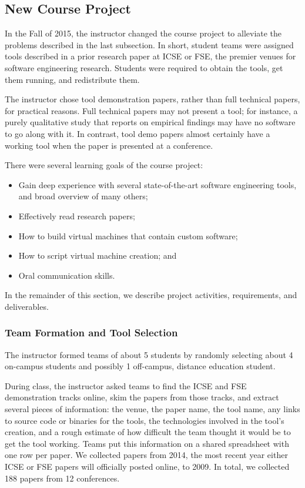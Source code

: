 \documentclass[10pt,conference]{IEEEtran}
\begin{document}
\subsection{New Course Project}\label{sec:thisProj}

In the Fall of 2015, the instructor changed the course project
to alleviate the problems described in the last subsection.
In short, student teams were assigned tools described in a 
prior research paper at ICSE or FSE, the premier 
venues for software engineering research.
Students were required to obtain the tools, get them running,
and redistribute them.

The instructor chose tool demonstration papers, rather than
full technical papers, for practical reasons.
Full technical papers may not present a tool; for 
instance, a purely qualitative study that reports on 
empirical findings may have no software to go along with it.
In contrast, tool demo papers almost certainly have a working
tool when the paper is presented at a conference. 

There were several learning goals of the course project:

\begin{itemize}
  \item Gain deep experience with several state-of-the-art
  		software engineering tools, and broad overview of many others;
  \item Effectively read research papers;
  \item How to build virtual machines that contain custom
  		software;
  \item How to script virtual machine creation; and
  \item Oral communication skills. 
\end{itemize}

In the remainder of this section, we describe project
activities, requirements, and deliverables.

\subsubsection{Team Formation and Tool Selection}

The instructor formed teams of about 5 students by randomly
selecting about 4 on-campus students and possibly 1 off-campus, distance
education student.

During class, the instructor asked teams to find the ICSE
and FSE demonstration tracks online, skim the papers from those
tracks, and extract several pieces of information:
the venue, the paper name, the tool name, any links to source
code or binaries for the tools, the technologies involved in the 
tool's creation, and a rough estimate of how 
difficult the team thought it would be to get the tool working.
Teams put this information on a shared spreadsheet with one row per paper.
We collected papers from 2014, the most recent year either ICSE or FSE
papers will officially posted online, to 2009.
In total, we collected 188 papers from 12 conferences.
\end{document}
